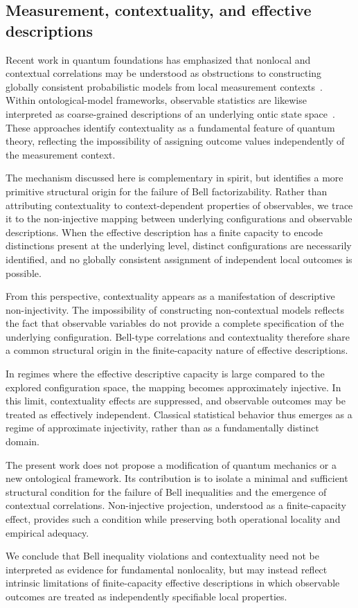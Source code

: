 \subsection{Measurement, contextuality, and effective descriptions}
  \label{subsec:contextuality}

  Recent work in quantum foundations has emphasized that nonlocal and contextual
  correlations may be understood as obstructions to constructing globally consistent
  probabilistic models from local measurement contexts~\cite{AbramskyBrandenburger2011}.
  Within ontological-model frameworks, observable statistics are likewise interpreted
  as coarse-grained descriptions of an underlying ontic state space~\cite{Spekkens2007}.
  These approaches identify contextuality as a fundamental feature of quantum theory,
  reflecting the impossibility of assigning outcome values independently of the
  measurement context.

  The mechanism discussed here is complementary in spirit, but identifies a more
  primitive structural origin for the failure of Bell factorizability.
  Rather than attributing contextuality to context-dependent properties of observables,
  we trace it to the non-injective mapping between underlying configurations and
  observable descriptions.
  When the effective description has a finite capacity to encode distinctions present
  at the underlying level, distinct configurations are necessarily identified, and no
  globally consistent assignment of independent local outcomes is possible.

  From this perspective, contextuality appears as a manifestation of descriptive
  non-injectivity.
  The impossibility of constructing non-contextual models reflects the fact that
  observable variables do not provide a complete specification of the underlying
  configuration.
  Bell-type correlations and contextuality therefore share a common structural origin
  in the finite-capacity nature of effective descriptions.

  In regimes where the effective descriptive capacity is large compared to the
  explored configuration space, the mapping becomes approximately injective.
  In this limit, contextuality effects are suppressed, and observable outcomes may be
  treated as effectively independent.
  Classical statistical behavior thus emerges as a regime of approximate injectivity,
  rather than as a fundamentally distinct domain.

  The present work does not propose a modification of quantum mechanics or a new
  ontological framework.
  Its contribution is to isolate a minimal and sufficient structural condition for the
  failure of Bell inequalities and the emergence of contextual correlations.
  Non-injective projection, understood as a finite-capacity effect, provides such a
  condition while preserving both operational locality and empirical adequacy.

  We conclude that Bell inequality violations and contextuality need not be interpreted
  as evidence for fundamental nonlocality, but may instead reflect intrinsic limitations
  of finite-capacity effective descriptions in which observable outcomes are treated as
  independently specifiable local properties.
